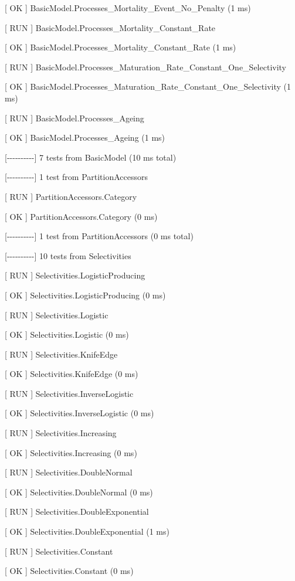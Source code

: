 \documentclass[a4paper,11pt,twoside,pdftex,draft]{article}
\begin{document}
{[} OK {]} BasicModel.Processes\_Mortality\_Event\_No\_Penalty (1 ms)

{[} RUN {]} BasicModel.Processes\_Mortality\_Constant\_Rate

{[} OK {]} BasicModel.Processes\_Mortality\_Constant\_Rate (1 ms)

{[} RUN {]}
BasicModel.Processes\_Maturation\_Rate\_Constant\_One\_Selectivity

{[} OK {]}
BasicModel.Processes\_Maturation\_Rate\_Constant\_One\_Selectivity (1
ms)

{[} RUN {]} BasicModel.Processes\_Ageing

{[} OK {]} BasicModel.Processes\_Ageing (1 ms)

{[}-\/-\/-\/-\/-\/-\/-\/-\/-\/-{]} 7 tests from BasicModel (10 ms total)

{[}-\/-\/-\/-\/-\/-\/-\/-\/-\/-{]} 1 test from PartitionAccessors

{[} RUN {]} PartitionAccessors.Category

{[} OK {]} PartitionAccessors.Category (0 ms)

{[}-\/-\/-\/-\/-\/-\/-\/-\/-\/-{]} 1 test from PartitionAccessors (0 ms
total)

{[}-\/-\/-\/-\/-\/-\/-\/-\/-\/-{]} 10 tests from Selectivities

{[} RUN {]} Selectivities.LogisticProducing

{[} OK {]} Selectivities.LogisticProducing (0 ms)

{[} RUN {]} Selectivities.Logistic

{[} OK {]} Selectivities.Logistic (0 ms)

{[} RUN {]} Selectivities.KnifeEdge

{[} OK {]} Selectivities.KnifeEdge (0 ms)

{[} RUN {]} Selectivities.InverseLogistic

{[} OK {]} Selectivities.InverseLogistic (0 ms)

{[} RUN {]} Selectivities.Increasing

{[} OK {]} Selectivities.Increasing (0 ms)

{[} RUN {]} Selectivities.DoubleNormal

{[} OK {]} Selectivities.DoubleNormal (0 ms)

{[} RUN {]} Selectivities.DoubleExponential

{[} OK {]} Selectivities.DoubleExponential (1 ms)

{[} RUN {]} Selectivities.Constant

{[} OK {]} Selectivities.Constant (0 ms)
\end{document}
